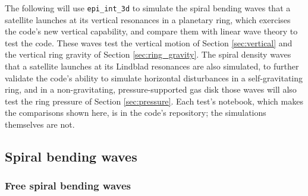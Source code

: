 \documentclass[twocolumn]{aastex702}
\newcommand{\code}[1]{\texttt{#1}}   %
\begin{document}
The following will use \code{epi\_int\_3d} to simulate the spiral bending waves that a satellite launches at its
vertical resonances in a planetary ring, which exercises the code's new vertical capability, and compare
them with linear wave theory to test the code. These waves test the vertical motion of
Section \ref{sec:vertical} and the vertical ring gravity of Section \ref{sec:ring_gravity}. The spiral density waves
that a satellite launches at its Lindblad resonances are also simulated, to further validate
the code's ability to simulate horizontal disturbances in a self-gravitating ring, and in a
non-gravitating, pressure-supported gas disk those waves will also test the ring pressure of
Section \ref{sec:pressure}. Each test's notebook, which makes the comparisons shown here, is
in the code's repository; the simulations themselves are not.

\subsection{Spiral bending waves}
\label{sec:bending}

\subsubsection{Free spiral bending waves}
\label{sec:waves_free}
\end{document}
